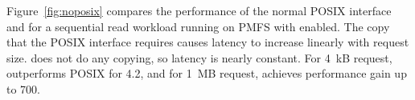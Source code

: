 Figure~\ref{fig:noposix} compares the performance of the normal POSIX interface
and \texttt{\grb{}} for a sequential read workload running on PMFS with
\Chell{} enabled.  The copy that the POSIX interface requires causes latency to
increase linearly with request size.  \texttt{\grb{}} does not do any copying, so
latency is nearly constant.  For 4~kB request, \grb{} outperforms POSIX for
4.2\x{}, and for 1~MB request, \texttt{\grb{}} achieves performance gain up to
700\x{}.


